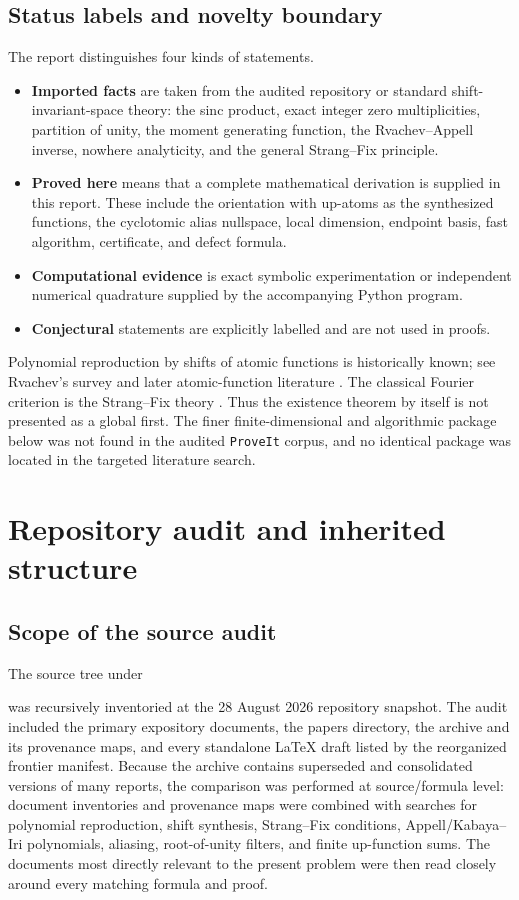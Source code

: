 \documentclass[11pt,oneside]{article}
\theoremstyle{definition}
\theoremstyle{remark}
\newcommand{\Repo}{\texttt{ProveIt}}
\begin{document}
\subsection{Status labels and novelty boundary}
The report distinguishes four kinds of statements.
\begin{itemize}
\item \textbf{Imported facts} are taken from the audited repository or standard shift-invariant-space theory: the sinc product, exact integer zero multiplicities, partition of unity, the moment generating function, the Rvachev--Appell inverse, nowhere analyticity, and the general Strang--Fix principle.
\item \textbf{Proved here} means that a complete mathematical derivation is supplied in this report.  These include the orientation with up-atoms as the synthesized functions, the cyclotomic alias nullspace, local dimension, endpoint basis, fast algorithm, certificate, and defect formula.
\item \textbf{Computational evidence} is exact symbolic experimentation or independent numerical quadrature supplied by the accompanying Python program.
\item \textbf{Conjectural} statements are explicitly labelled and are not used in proofs.
\end{itemize}

Polynomial reproduction by shifts of atomic functions is historically known; see Rvachev's survey and later atomic-function literature \cite{rvachev1990,kravchenko2015}.  The classical Fourier criterion is the Strang--Fix theory \cite{strangfix1973,jia1998}.  Thus the existence theorem by itself is not presented as a global first.  The finer finite-dimensional and algorithmic package below was not found in the audited \Repo{} corpus, and no identical package was located in the targeted literature search.

\section{Repository audit and inherited structure}
\label{sec:audit}

\subsection{Scope of the source audit}
The source tree under
\begin{center}
\end{center}
was recursively inventoried at the 28 August 2026 repository snapshot.  The audit included the primary expository documents, the papers directory, the archive and its provenance maps, and every standalone LaTeX draft listed by the reorganized frontier manifest.  Because the archive contains superseded and consolidated versions of many reports, the comparison was performed at source/formula level: document inventories and provenance maps were combined with searches for polynomial reproduction, shift synthesis, Strang--Fix conditions, Appell/Kabaya--Iri polynomials, aliasing, root-of-unity filters, and finite up-function sums.  The documents most directly relevant to the present problem were then read closely around every matching formula and proof.
\end{document}
